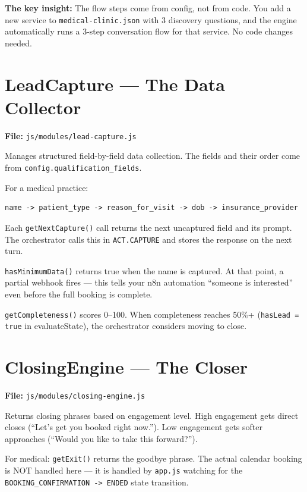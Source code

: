 \documentclass[12pt, a4paper]{report}
\newcommand{\ic}[1]{\texttt{\small\color{accentblue!70!black}#1}}
\begin{document}
\begin{infobox}
  \textbf{The key insight:} The flow steps come from config, not from code. You add a
  new service to \ic{medical-clinic.json} with 3 discovery questions, and the engine
  automatically runs a 3-step conversation flow for that service. No code changes needed.
\end{infobox}

\section{LeadCapture --- The Data Collector}

\textbf{File:} \ic{js/modules/lead-capture.js}

Manages structured field-by-field data collection. The fields and their order come from
\ic{config.qualification\_fields}.

For a medical practice:
\begin{lstlisting}
name -> patient_type -> reason_for_visit -> dob -> insurance_provider
\end{lstlisting}

Each \ic{getNextCapture()} call returns the next uncaptured field and its prompt. The
orchestrator calls this in \ic{ACT.CAPTURE} and stores the response on the next turn.

\ic{hasMinimumData()} returns true when the name is captured. At that point, a partial
webhook fires --- this tells your n8n automation ``someone is interested'' even before
the full booking is complete.

\ic{getCompleteness()} scores 0--100. When completeness reaches 50\%+ (\ic{hasLead =
true} in evaluateState), the orchestrator considers moving to close.

\section{ClosingEngine --- The Closer}

\textbf{File:} \ic{js/modules/closing-engine.js}

Returns closing phrases based on engagement level. High engagement gets direct closes
(``Let's get you booked right now.''). Low engagement gets softer approaches (``Would
you like to take this forward?'').

For medical: \ic{getExit()} returns the goodbye phrase. The actual calendar booking is
NOT handled here --- it is handled by \ic{app.js} watching for the
\ic{BOOKING\_CONFIRMATION -> ENDED} state transition.
\end{document}
